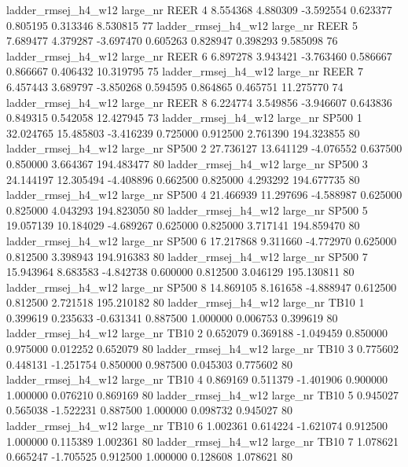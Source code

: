 ladder_rmsej_h4_w12   large_nr     REER                 4  8.554368  4.880309  -3.592554 0.623377 0.805195  0.313346    8.530815 77
ladder_rmsej_h4_w12   large_nr     REER                 5  7.689477  4.379287  -3.697470 0.605263 0.828947  0.398293    9.585098 76
ladder_rmsej_h4_w12   large_nr     REER                 6  6.897278  3.943421  -3.763460 0.586667 0.866667  0.406432   10.319795 75
ladder_rmsej_h4_w12   large_nr     REER                 7  6.457443  3.689797  -3.850268 0.594595 0.864865  0.465751   11.275770 74
ladder_rmsej_h4_w12   large_nr     REER                 8  6.224774  3.549856  -3.946607 0.643836 0.849315  0.542058   12.427945 73
ladder_rmsej_h4_w12   large_nr    SP500                 1 32.024765 15.485803  -3.416239 0.725000 0.912500  2.761390  194.323855 80
ladder_rmsej_h4_w12   large_nr    SP500                 2 27.736127 13.641129  -4.076552 0.637500 0.850000  3.664367  194.483477 80
ladder_rmsej_h4_w12   large_nr    SP500                 3 24.144197 12.305494  -4.408896 0.662500 0.825000  4.293292  194.677735 80
ladder_rmsej_h4_w12   large_nr    SP500                 4 21.466939 11.297696  -4.588987 0.625000 0.825000  4.043293  194.823050 80
ladder_rmsej_h4_w12   large_nr    SP500                 5 19.057139 10.184029  -4.689267 0.625000 0.825000  3.717141  194.859470 80
ladder_rmsej_h4_w12   large_nr    SP500                 6 17.217868  9.311660  -4.772970 0.625000 0.812500  3.398943  194.916383 80
ladder_rmsej_h4_w12   large_nr    SP500                 7 15.943964  8.683583  -4.842738 0.600000 0.812500  3.046129  195.130811 80
ladder_rmsej_h4_w12   large_nr    SP500                 8 14.869105  8.161658  -4.888947 0.612500 0.812500  2.721518  195.210182 80
ladder_rmsej_h4_w12   large_nr     TB10                 1  0.399619  0.235633  -0.631341 0.887500 1.000000  0.006753    0.399619 80
ladder_rmsej_h4_w12   large_nr     TB10                 2  0.652079  0.369188  -1.049459 0.850000 0.975000  0.012252    0.652079 80
ladder_rmsej_h4_w12   large_nr     TB10                 3  0.775602  0.448131  -1.251754 0.850000 0.987500  0.045303    0.775602 80
ladder_rmsej_h4_w12   large_nr     TB10                 4  0.869169  0.511379  -1.401906 0.900000 1.000000  0.076210    0.869169 80
ladder_rmsej_h4_w12   large_nr     TB10                 5  0.945027  0.565038  -1.522231 0.887500 1.000000  0.098732    0.945027 80
ladder_rmsej_h4_w12   large_nr     TB10                 6  1.002361  0.614224  -1.621074 0.912500 1.000000  0.115389    1.002361 80
ladder_rmsej_h4_w12   large_nr     TB10                 7  1.078621  0.665247  -1.705525 0.912500 1.000000  0.128608    1.078621 80
